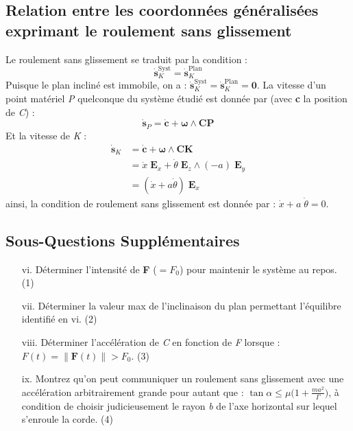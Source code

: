 \documentclass[a4paper]{article}
\begin{document}
\subsection{Relation entre les coordonnées généralisées exprimant le roulement sans glissement}





Le roulement sans glissement se traduit par la condition : 
\[ \dot{\textbf{s}}_K^{\text{Syst}} = \dot{\textbf{s}}_K^{\text{Plan}} \]
Puisque le plan incliné est immobile, on a : $ \dot{\textbf{s}}_K^{\text{Syst}} = \dot{\textbf{s}}_K^{\text{Plan}} = \textbf{0} $. La vitesse d’un point matériel \emph{P} quelconque du système étudié est donnée par (avec \textbf{c} la position de \emph{C}) : 
\[ \dot{\textbf{s}}_P = \dot{\textbf{c}} + \boldsymbol{\omega} \wedge \textbf{CP} \]
Et la vitesse de \emph{K} : 
\[ \begin{aligned}
\dot{\textbf{s}}_K &= \dot{\textbf{c}} + \boldsymbol{\omega} \wedge \textbf{CK} \\
&= \dot{x} \; \textbf{E}_x + \dot{\theta} \; \textbf{E}_z \wedge (- a) \; \textbf{E}_y \\
&= (\dot{x} + a \dot{\theta}) \; \textbf{E}_x
\end{aligned} \]
ainsi, la condition de roulement sans glissement est donnée par : $ \dot{x} + a \; \dot{\theta} = 0 $.





\subsection{Sous-Questions Supplémentaires}





\begin{enumerate}[i.]
\item[vi.] Déterminer l'intensité de \textbf{F} ($ = F_0 $) pour maintenir le système au repos. (1)
\item[vii.] Déterminer la valeur max de l’inclinaison du plan permettant l’équilibre identifié en vi. (2)
\item[viii.] Déterminer l’accélération de \emph{C} en fonction de \emph{F} lorsque : $ F(t) = \| \textbf{F}(t) \| > F_0 $. (3)
\item[ix.] Montrez qu’on peut communiquer un roulement sans glissement avec une accélération arbitrairement grande pour autant que : $\displaystyle \tan \alpha \leq \mu \bigg( 1 + \frac{m a^2}{\Gamma} \bigg) $, à condition de choisir judicieusement le rayon \emph{b} de l’axe horizontal sur lequel s’enroule la corde. (4)
\end{enumerate}
\end{document}
